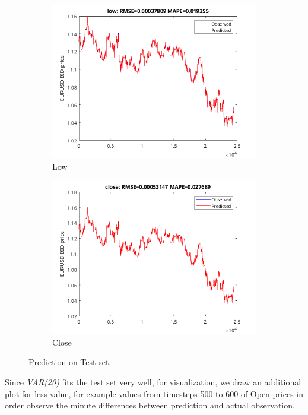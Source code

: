 \documentclass[11pt]{article}
\begin{document}
\begin{figure}[H]
\begin{subfigure}[b]{0.5\textwidth}
      \includegraphics[width=\textwidth,keepaspectratio]{figs/var20low.png}
      \caption{Low}
    \end{subfigure}
    \quad\quad\quad\quad\quad\quad\quad
    \begin{subfigure}[b]{0.5\textwidth}
      \includegraphics[width=\textwidth,keepaspectratio]{figs/var20close.png}
      \caption{Close}
    \end{subfigure}
    \caption{Prediction on Test set.}
\end{figure}

Since \textit{VAR(20)} fits the test set very well, for visualization, we draw
an additional plot for less value, for example values from timesteps 500 to 600
of Open prices in order observe the minute differences between prediction and
actual observation. 
\end{document}
